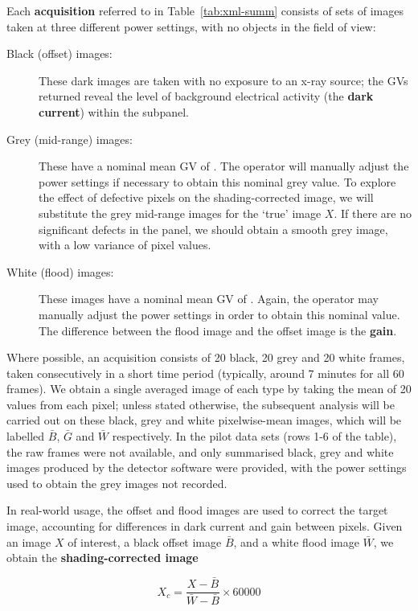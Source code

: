 \documentclass[\main/IO-Pixels.tex]{subfiles}
\begin{document}
Each \textbf{acquisition} referred to in Table~\ref{tab:xml-summ} consists of sets of images taken at three different power settings, with no objects in the field of view:
\begin{description}

\item[Black (offset) images:] These dark images are taken with no exposure to an x-ray source; the GVs returned reveal the level of background electrical activity (the \textbf{dark current}) within the subpanel.
\item[Grey (mid-range) images:] These have a nominal mean GV of . The operator will manually adjust the power settings if necessary to obtain this nominal grey value. To explore the effect of defective pixels on the shading-corrected image, we will substitute the grey mid-range images for the `true' image $X$. If there are no significant defects in the panel, we should obtain a smooth grey image, with a low variance of pixel values.
\item[White (flood) images:] These images have a nominal mean GV of . Again, the operator may manually adjust the power settings in order to obtain this nominal value. The difference between the flood image and the offset image is the \textbf{gain}.
\end{description}

Where possible, an acquisition consists of 20 black, 20 grey and 20 white frames, taken consecutively in a short time period (typically, around 7 minutes for all 60 frames). We obtain a single averaged image of each type by taking the mean of 20 values from each pixel; unless stated otherwise, the subsequent analysis will be carried out on these black, grey and white pixelwise-mean images, which will be labelled $\bar{B}$, $\bar{G}$ and $\bar{W}$ respectively. In the pilot data sets (rows 1-6 of the table), the raw frames were not available, and only summarised black, grey and white images produced by the detector software were provided, with the power settings used to obtain the grey images not recorded.

In real-world usage, the offset and flood images are used to correct the target image, accounting for differences in dark current and gain between pixels. Given an image $X$ of interest, a black offset image $\bar{B}$, and a white flood image $\bar{W}$, we obtain the \textbf{shading-corrected image}

\begin{equation}
	X_c = \frac{X -\bar{B}}{\bar{W} -\bar{B}} \times 60000
\end{equation}
\end{document}
